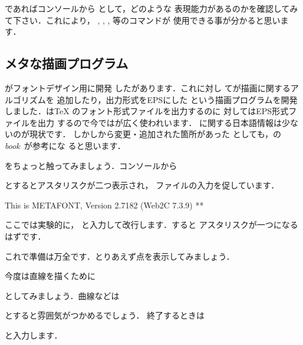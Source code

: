\begin{Prob}
\unixos であればコンソールから として，どのような
表現能力があるのかを確認してみて下さい．これにより，
, , ,  等のコマンドが
使用できる事が分かると思います．
\end{Prob}


\subsection{メタな描画プログラム}
%
がフォントデザイン用に開発
した\Prog[MetaFont]{\MF}があります．これに対し
てが描画に関するアルゴリズムを%
追加したり，出力形式をEPSにした\Prog[MetaPost]{\MP}
という描画プログラムを開発しました．{\MF}は{\TeX}
のフォント形式ファイルを出力するのに
対して{\MP}はEPS形式ファイルを出力
するので今では{\MP}が広く使われいます．
{\MP}に関する日本語情報は少ないのが現状です．
しかし{\MF}から変更・追加された箇所があった
としても，の
\emph{\MF book}~\cite{metafontbook}が参考にな
ると思います．

{\MF}をちょっと触ってみましょう．コンソールから
\begin{InTerm}
\end{InTerm}
とするとアスタリスク\qu{\str{*}}が二つ表示され，
ファイルの入力を促しています．

\begin{OutTerm}
This is METAFONT, Version 2.7182 (Web2C 7.3.9)
**
\end{OutTerm}

ここでは実験的に，
と入力して改行します．すると
アスタリスクが一つになるはずです．
\begin{InTerm}
   \type[**]{\relax}
\end{InTerm}
これで準備は万全です．とりあえず点を表示してみましょう．
\begin{InTerm}
\end{InTerm}
今度は直線を描くために
\begin{InTerm}
\end{InTerm}
としてみましょう．曲線などは
\begin{InTerm}
\end{InTerm} 
とすると雰囲気がつかめるでしょう．
終了するときは
\begin{InTerm}
\end{InTerm}
と入力します．

